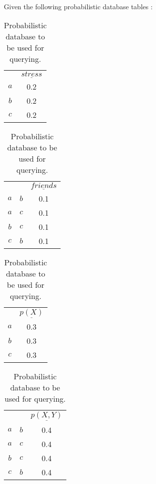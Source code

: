 


\noindent Given the following probabilistic database tables :

\begin{table}[h]

	\centering
	
	\begin{subtable}{.2\linewidth}{
	\centering
	\begin{tabular}{c|c}
		& $\underline{stress}$\\
		$a$ & 0.2\\
		$b$ & 0.2\\
		$c$ & 0.2
	\end{tabular}}
	\label{tab:1a}
	\end{subtable}
	\begin{subtable}{.2\linewidth}{
	\begin{tabular}{cc|c}
		& & $\underline{friends}$\\
		$a$ & $b$ & 0.1\\
		$a$ & $c$ & 0.1\\
		$b$ & $c$ & 0.1\\
		$c$ & $b$ & 0.1\\
	\end{tabular}}
	\label{tab:2a}
	\end{subtable}
	\begin{subtable}{.2\linewidth}{
	\begin{tabular}{c|c}
		& $\underline{p(X)}$\\
		$a$ & 0.3\\
		$b$ & 0.3\\
		$c$ & 0.3\\
	\end{tabular}}
	\label{tab:3a}
	\end{subtable}
	\begin{subtable}{.2\linewidth}{
	\begin{tabular}{cc|c}
		& & $\underline{p(X,Y)}$\\
		$a$ & $b$ & 0.4\\
		$a$ & $c$ & 0.4\\
		$b$ & $c$ & 0.4\\
		$c$ & $b$ & 0.4\\
	\end{tabular}}
	\label{tab:4a}
	\end{subtable}

	\caption{Probabilistic database to be used for querying.}\label{tab:probdata}

\end{table}

